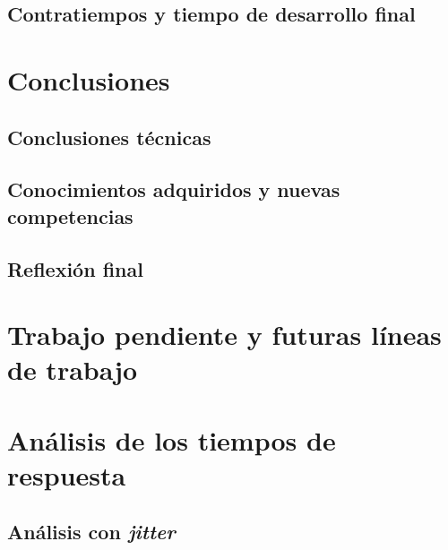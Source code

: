 \section{Contratiempos y tiempo de desarrollo final}

\chapter{Conclusiones}\label{chap:conclussions}
\section{Conclusiones técnicas}
\section{Conocimientos adquiridos y nuevas competencias}
\section{Reflexión final}

\chapter{Trabajo pendiente y futuras líneas de trabajo}\label{chap:pending-work}

\appendix
\chapter{Análisis de los tiempos de respuesta}\label{chap:rta}

\section{Análisis con \textit{jitter}}\label{sec:rta-jitter}

